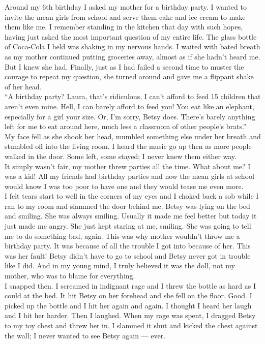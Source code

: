 \documentclass[a5paper]{scrartcl}
\begin{document}
Around my 6th birthday I asked my mother for a birthday party. I wanted to invite the mean girls from school and serve them cake and ice cream to make them like me. I remember standing in the kitchen that day with such hopes, having just asked the most important question of my entire life. The glass bottle of Coca-Cola I held was shaking in my nervous hands. I waited with bated breath as my mother continued putting groceries away, almost as if she hadn't heard me. But I knew she had. Finally, just as I had failed a second time to muster the courage to repeat my question, she turned around and gave me a flippant shake of her head.\\

\enquote{A birthday party? Laura, that's ridiculous, I can't afford to feed 15 children that aren't even mine. Hell, I can barely afford to feed you! You eat like an elephant, especially for a girl your size. Or, I'm sorry, Betsy does. There's barely anything left for me to eat around here, much less a classroom of other people's brats.}\\

My face fell as she shook her head, mumbled something else under her breath and stumbled off into the living room. I heard the music go up then as more people walked in the door. Some left, some stayed; I never knew them either way. \\

It simply wasn't fair, my mother threw parties all the time. What about me? I was a kid! All my friends had birthday parties and now the mean girls at school would know I was too poor to have one and they would tease me even more.\\

I felt tears start to well in the corners of my eyes and I choked back a sob while I ran to my room and slammed the door behind me. Betsy was lying on the bed and smiling. She was always smiling. Usually it made me feel better but today it just made me angry. She just kept staring at me, smiling. She was going to tell me to do something bad, again. This was why mother wouldn't throw me a birthday party. It was because of all the trouble I got into because of her. This was her fault! Betsy didn't have to go to school and Betsy never got in trouble like I did. And in my young mind, I truly believed it was the doll, not my mother, who was to blame for everything.\\

I snapped then. I screamed in indignant rage and I threw the bottle as hard as I could at the bed. It hit Betsy on her forehead and she fell on the floor. Good. I picked up the bottle and I hit her again and again. I thought I heard her laugh and I hit her harder. Then I laughed. When my rage was spent, I dragged Betsy to my toy chest and threw her in. I slammed it shut and kicked the chest against the wall; I never wanted to see Betsy again --- ever.\\
\end{document}
